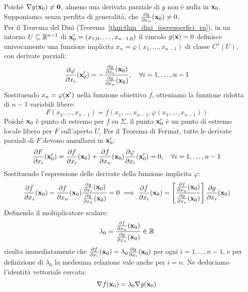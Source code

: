 \begin{dimostrazione}
Poiché $\nabla g(\mathbf{x}_0) \neq \mathbf{0}$, almeno una derivata parziale di $g$ non è nulla in $\mathbf{x}_0$. Supponiamo, senza perdita di generalità, che $\frac{\partial g}{\partial x_n}(\mathbf{x}_0) \neq 0$.\\
Per il Teorema del Dini (Teorema~\ref{thm:thm_dini_ipersuperfici_rn}), in un intorno $U \subseteq \mathbb{R}^{n-1}$ di $\mathbf{x}_0' = (x_{1,0}, \dots, x_{n-1,0})$ il vincolo $g(\mathbf{x}) = 0$ definisce univocamente una funzione implicita $x_n = \varphi(x_1, \dots, x_{n-1})$ di classe $C^1(U)$, con derivate parziali:
\[
\frac{\partial \varphi}{\partial x_i}(\mathbf{x}_0') = -\frac{\frac{\partial g}{\partial x_i}(\mathbf{x}_0)}{\frac{\partial g}{\partial x_n}(\mathbf{x}_0)}, \quad \forall i=1,\dots,n-1
\]
Sostituendo $x_n = \varphi(\mathbf{x}')$ nella funzione obiettivo $f$, otteniamo la funzione ridotta di $n-1$ variabili libere:
\[
F(x_1, \dots, x_{n-1}) = f(x_1, \dots, x_{n-1}, \varphi(x_1, \dots, x_{n-1}))
\]
Poiché $\mathbf{x}_0$ è punto di estremo per $f$ su $\Sigma$, il punto $\mathbf{x}_0'$ è un punto di estremo locale libero per $F$ sull'aperto $U$.
Per il Teorema di Fermat, tutte le derivate parziali di $F$ devono annullarsi in $\mathbf{x}_0'$:
\[
\frac{\partial F}{\partial x_i}(\mathbf{x}_0') = \frac{\partial f}{\partial x_i}(\mathbf{x}_0) + \frac{\partial f}{\partial x_n}(\mathbf{x}_0) \frac{\partial \varphi}{\partial x_i}(\mathbf{x}_0') = 0, \quad \forall i=1,\dots,n-1
\]
Sostituendo l'espressione delle derivate della funzione implicita $\varphi$:
\[
\frac{\partial f}{\partial x_i}(\mathbf{x}_0) - \frac{\partial f}{\partial x_n}(\mathbf{x}_0) \frac{\frac{\partial g}{\partial x_i}(\mathbf{x}_0)}{\frac{\partial g}{\partial x_n}(\mathbf{x}_0)} = 0 \implies \frac{\partial f}{\partial x_i}(\mathbf{x}_0) = \left[ \frac{\frac{\partial f}{\partial x_n}(\mathbf{x}_0)}{\frac{\partial g}{\partial x_n}(\mathbf{x}_0)} \right] \frac{\partial g}{\partial x_i}(\mathbf{x}_0)
\]
Definendo il moltiplicatore scalare:
\[
\lambda_0 = \frac{\frac{\partial f}{\partial x_n}(\mathbf{x}_0)}{\frac{\partial g}{\partial x_n}(\mathbf{x}_0)} \in \mathbb{R}
\]
risulta immediatamente che $\frac{\partial f}{\partial x_i}(\mathbf{x}_0) = \lambda_0 \frac{\partial g}{\partial x_i}(\mathbf{x}_0)$ per ogni $i=1,\dots,n-1$, e per definizione di $\lambda_0$ la medesima relazione vale anche per $i=n$.
Ne deduciamo l'identità vettoriale cercata:
\[
\nabla f(\mathbf{x}_0) = \lambda_0 \nabla g(\mathbf{x}_0)
\]
\end{dimostrazione}

